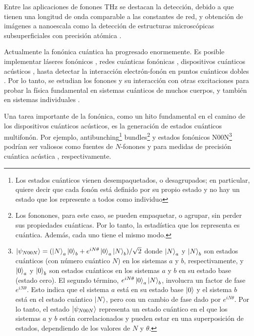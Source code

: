 \documentclass[../main.tex]{subfiles}
\begin{document}
Entre las aplicaciones de fonones THz se destacan la detección, debido a que tienen una longitud de onda comparable a las constantes de red, y obtención de imágenes a nanoescala como la detección de estructuras microscópicas subsuperficiales con precisión atómica \parencite{Bin2020}.

Actualmente la fonónica cuántica ha progresado enormemente. Es posible implementar láseres fonónicos \parencite{Kabuss2012}, redes cuánticas fonónicas \parencite{Lemonde2018}, dispositivos cuánticos acústicos \parencite{Schütz2017}, hasta detectar la interacción electrón-fonón en puntos cuánticos dobles \parencite{Hartke2018}. Por lo tanto, se estudian los fonones y su interacción con otras excitaciones para probar la física fundamental en sistemas cuánticos de muchos cuerpos, y también en sistemas individuales \parencite{Lupke2022}.

Una tarea importante de la fonónica, como un hito fundamental en el camino de los dispositivos cuánticos acústicos, es la generación de estados cuánticos multifonón. Por ejemplo, antibunching\footnote{Los estados cuánticos vienen desempaquetados, o desagrupados; en particular, quiere decir que cada fonón está definido por su propio estado y no hay un estado que los represente a todos como individuo} bundles\footnote{Los fononones, para este caso, se pueden empaquetar, o agrupar, sin perder sus propiedades cuánticas. Por lo tanto, la estadística que los representa es cuántica. Además, cada uno tiene el mismo modo.} y estados fonónicos N00N\footnote{$\ket{\psi_{N00N}}=(\ket{N}_a \ket{0}_b + e^{iN\theta} \ket{0}_a \ket{N}_b)/\sqrt{2}$ donde \(\ket{N}_a\) y \(\ket{N}_b\) son estados cuánticos (con número cuántico $N$) en los sistemas $a$ y $b$, respectivamente, y \(\ket{0}_a\) y \(\ket{0}_b\) son estados cuánticos en los sistemas $a$ y $b$ en su estado base (estado cero). El segundo término, \(e^{iN\theta} \ket{0}_a \ket{N}_b\), involucra un factor de fase \(e^{iN\theta}\). Esto indica que el sistema $a$ está en su estado base \(\ket{0}\) y el sistema $b$ está en el estado cuántico \(\ket{N}\), pero con un cambio de fase dado por \(e^{iN\theta}\). Por lo tanto, el estado $\ket{\psi_{N00N}}$ representa un estado cuántico en el que los sistemas $a$ y $b$ están correlacionados y pueden estar en una superposición de estados, dependiendo de los valores de \(N\) y \(\theta\).} podrían ser valiosos como fuentes de $N$-fonones \parencite{Chu2018} y para medidas de precisión cuántica acústica \parencite{Toyoda2015}, respectivamente. 
\end{document}
